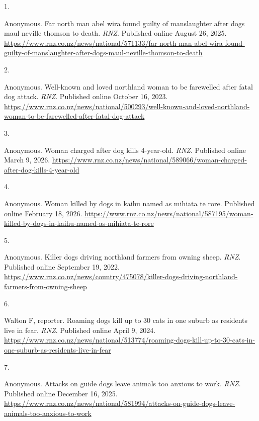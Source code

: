 \documentclass[
  letterpaper,
  DIV=11,
  numbers=noendperiod]{scrartcl}
\newlength{\cslhangindent}
\newlength{\csllabelwidth}
\newenvironment{CSLReferences}[2] %
 {\begin{list}{}{%
  \setlength{\itemindent}{0pt}
  \setlength{\leftmargin}{0pt}
  \setlength{\parsep}{0pt}
  \ifodd #1
   \setlength{\leftmargin}{\cslhangindent}
   \setlength{\itemindent}{-1\cslhangindent}
  \fi
  \setlength{\itemsep}{#2\baselineskip}}}
 {\end{list}}
\newcommand{\CSLLeftMargin}[1]{\parbox[t]{\csllabelwidth}{\strut#1\strut}}
\newcommand{\CSLRightInline}[1]{\parbox[t]{\linewidth - \csllabelwidth}{\strut#1\strut}}
\begin{document}
\protect{}\label{refs}
\begin{CSLReferences}{0}{1}
\CSLLeftMargin{1. }%
\CSLRightInline{Anonymous. Far north man abel wira found guilty of
manslaughter after dogs maul neville thomson to death. \emph{RNZ}.
Published online August 26, 2025.
\url{https://www.rnz.co.nz/news/national/571133/far-north-man-abel-wira-found-guilty-of-manslaughter-after-dogs-maul-neville-thomson-to-death}}

\CSLLeftMargin{2. }%
\CSLRightInline{Anonymous. Well-known and loved northland woman to be
farewelled after fatal dog attack. \emph{RNZ}. Published online October
16, 2023.
\url{https://www.rnz.co.nz/news/national/500293/well-known-and-loved-northland-woman-to-be-farewelled-after-fatal-dog-attack}}

\CSLLeftMargin{3. }%
\CSLRightInline{Anonymous. Woman charged after dog kills 4-year-old.
\emph{RNZ}. Published online March 9, 2026.
\url{https://www.rnz.co.nz/news/national/589066/woman-charged-after-dog-kills-4-year-old}}

\CSLLeftMargin{4. }%
\CSLRightInline{Anonymous. Woman killed by dogs in kaihu named as
mihiata te rore. Published online February 18, 2026.
\url{https://www.rnz.co.nz/news/national/587195/woman-killed-by-dogs-in-kaihu-named-as-mihiata-te-rore}}

\CSLLeftMargin{5. }%
\CSLRightInline{Anonymous. Killer dogs driving northland farmers from
owning sheep. \emph{RNZ}. Published online September 19, 2022.
\url{https://www.rnz.co.nz/news/country/475078/killer-dogs-driving-northland-farmers-from-owning-sheep}}

\CSLLeftMargin{6. }%
\CSLRightInline{{Walton F, reporter}. Roaming dogs kill up to 30 cats in
one suburb as residents live in fear. \emph{RNZ}. Published online April
9, 2024.
\url{https://www.rnz.co.nz/news/national/513774/roaming-dogs-kill-up-to-30-cats-in-one-suburb-as-residents-live-in-fear}}

\CSLLeftMargin{7. }%
\CSLRightInline{Anonymous. Attacks on guide dogs leave animals too
anxious to work. \emph{RNZ}. Published online December 16, 2025.
\url{https://www.rnz.co.nz/news/national/581994/attacks-on-guide-dogs-leave-animals-too-anxious-to-work}}


\end{CSLReferences}
\end{document}

